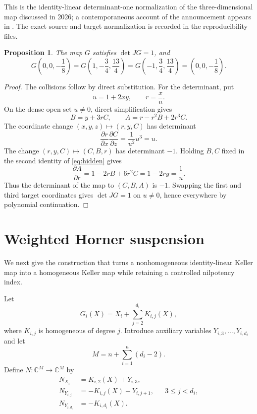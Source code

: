 \documentclass[11pt,reqno]{amsart}
\newtheorem{proposition}[theorem]{Proposition}
\newcommand{\C}{\mathbb C}
\begin{document}
This is the identity-linear determinant-one normalization of the
three-dimensional map discussed in 2026; a contemporaneous account of the
announcement appears in \cite{Long2026}.  The exact source and target
normalization is recorded in the reproducibility files.

\begin{proposition}\label{prop:G}
The map $G$ satisfies $\det JG=1$, and
\[
 G\left(0,0,-\frac18\right)
 =G\left(1,-\frac34,\frac{13}{4}\right)
 =G\left(-1,\frac34,\frac{13}{4}\right)
 =\left(0,0,-\frac18\right).
\]
\end{proposition}

\begin{proof}
The collisions follow by direct substitution.  For the determinant, put
\[
 u=1+2xy,
 \qquad
 r=\frac{x}{u}.
\]
On the dense open set $u\neq0$, direct simplification gives
\begin{equation}\label{eq:hidden}
 B=y+3rC,
 \qquad
 A=r-r^2B+2r^3C.
\end{equation}
The coordinate change $(x,y,z)\mapsto(r,y,C)$ has determinant
\[
 \frac{\partial r}{\partial x}\frac{\partial C}{\partial z}
 =\frac{1}{u^2}u^3=u.
\]
The change $(r,y,C)\mapsto(C,B,r)$ has determinant $-1$.  Holding $B,C$
fixed in the second identity of \eqref{eq:hidden} gives
\[
 \frac{\partial A}{\partial r}
 =1-2rB+6r^2C
 =1-2ry
 =\frac1u.
\]
Thus the determinant of the map to $(C,B,A)$ is $-1$.  Swapping the first
and third target coordinates gives $\det JG=1$ on $u\neq0$, hence
everywhere by polynomial continuation.
\end{proof}

\section{Weighted Horner suspension}

We next give the construction that turns a nonhomogeneous identity-linear
Keller map into a homogeneous Keller map while retaining a controlled
nilpotency index.

Let
\[
 G_i(X)=X_i+\sum_{j=2}^{d_i}K_{i,j}(X),
\]
where $K_{i,j}$ is homogeneous of degree $j$.  Introduce auxiliary variables
$Y_{i,3},\ldots,Y_{i,d_i}$ and let
\[
 M=n+\sum_{i=1}^n(d_i-2).
\]
Define $N:\C^M\to\C^M$ by
\begin{align}
 N_{X_i}&=K_{i,2}(X)+Y_{i,3},\label{eq:Nx}\\
 N_{Y_{i,j}}&=-K_{i,j}(X)-Y_{i,j+1},
 &&3\leq j<d_i,\label{eq:Ny}\\
 N_{Y_{i,d_i}}&=-K_{i,d_i}(X).\label{eq:Nlast}
\end{align}
\end{document}
